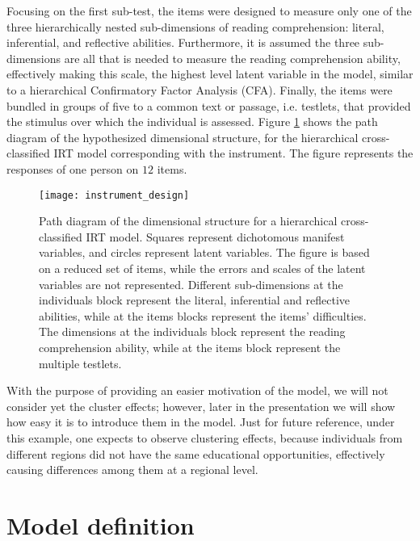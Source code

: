 Focusing on the first sub-test, the items were designed to measure only one of the three hierarchically nested sub-dimensions of reading comprehension: literal, inferential, and reflective abilities. Furthermore, it is assumed the three sub-dimensions are all that is needed to measure the reading comprehension ability, effectively making this scale, the highest level latent variable in the model, similar to a hierarchical Confirmatory Factor Analysis (CFA). Finally, the items were bundled in groups of five to a common text or passage, i.e. testlets, that provided the stimulus over which the individual is assessed. Figure \ref{fig:design} shows the path diagram of the hypothesized dimensional structure, for the hierarchical cross-classified IRT model corresponding with the instrument. The figure represents the responses of one person on $12$ items.
%
\begin{figure}[h]
	\centering
	\texttt{[image: instrument\_design]}
	\caption[Path diagram of the dimensional structure for a hierarchical cross-classified IRT model.]%
	{Path diagram of the dimensional structure for a hierarchical cross-classified IRT model. Squares represent dichotomous manifest variables, and circles represent latent variables. The figure is based on a reduced set of items, while the errors and scales of the latent variables are not represented. Different sub-dimensions at the individuals block represent the literal, inferential and reflective abilities, while at the items blocks represent the items' difficulties. The dimensions at the individuals block represent the reading comprehension ability, while at the items block represent the multiple testlets.}
	\label{fig:design}
\end{figure}

With the purpose of providing an easier motivation of the model, we will not consider yet the cluster effects; however, later in the presentation we will show how easy it is to introduce them in the model. Just for future reference, under this example, one expects to observe clustering effects, because individuals from different regions did not have the same educational opportunities, effectively causing differences among them at a regional level.


\section{Model definition} \label{sect:definition}

